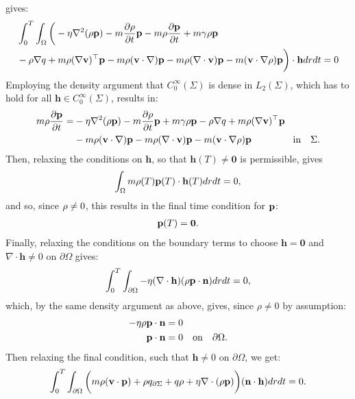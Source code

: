 gives:
\begin{align*}
&\int_0^T \int_\Omega 
\bigg( - \eta\nabla^2 (\rho \mathbf{p}) - m \frac{\partial \rho}{\partial t} \mathbf{p}  -  m\rho \frac{\partial \mathbf{p}}{\partial t} +m \gamma \rho \mathbf{p}\\
&-\rho\nabla q +m \rho (\nabla \mathbf{v})^\top\mathbf{p} 
-m \rho (\mathbf{v} \cdot \nabla)\mathbf{p} - m \rho (\nabla \cdot \mathbf{v})\mathbf{p}  - m (\mathbf{v} \cdot \nabla \rho)\mathbf{p}  \bigg)\cdot  \mathbf{h} drdt = 0
\end{align*}
Employing the density argument that $C_0^\infty(\Sigma)$ is dense in $L_2(\Sigma)$, which has to hold for all $\mathbf{h}\in C_0^\infty(\Sigma)$, results in:
\begin{align*}
  m\rho \frac{\partial \mathbf{p}}{\partial t} =& - \eta\nabla^2 (\rho \mathbf{p}) - m \frac{\partial \rho}{\partial t} \mathbf{p}   +m \gamma \rho \mathbf{p}-\rho\nabla q +m \rho (\nabla \mathbf{v})^\top\mathbf{p} \\
&-m \rho (\mathbf{v} \cdot \nabla)\mathbf{p} - m \rho (\nabla \cdot \mathbf{v})\mathbf{p}  - m (\mathbf{v} \cdot \nabla \rho)\mathbf{p}  \ \qquad\qquad \text{in} \quad \Sigma.
\end{align*}
Then, relaxing the conditions on $\mathbf{h}$, so that $\mathbf{h}(T) \neq \mathbf{0} $ is permissible, gives
\begin{align*}
 \int_\Omega m \rho(T) \mathbf{p}(T) \cdot \mathbf{h}(T) dr dt=0,
\end{align*}
and so, since $\rho \neq 0$, this results in the final time condition for $\mathbf{p}$:
\begin{align}
\mathbf{p}(T)=\mathbf{0}.
\end{align}
Finally, relaxing the conditions on the boundary terms to choose $\mathbf{h}=\mathbf{0}$ and $\nabla \cdot \mathbf{h}  \neq 0$ on $\partial \Omega$ gives:
\begin{align*}
\int_0^T \int_{\partial \Omega} -   \eta (\nabla \cdot \mathbf{h}) (\rho \mathbf{p} \cdot \mathbf{n})  dr dt = 0,
\end{align*}
which, by the same density argument as above, gives, since $\rho \neq 0$ by assumption:
\begin{align}
\label{CondAdj1}
- \eta  \rho \mathbf{p}  \cdot \mathbf{n}&= 0  \notag\\
 \mathbf{p}  \cdot \mathbf{n} &= 0 \quad \text{on} \quad \partial \Omega.
\end{align}
Then relaxing the final condition, such that $\mathbf{h} \neq 0$ on $\partial \Omega$, we get:
\begin{align*}
\int_0^T \int_{\partial\Omega} \bigg( m \rho (\mathbf{v} \cdot \mathbf{p})+\rho  {q}_{\partial \Sigma} + q \rho + \eta\nabla \cdot(\rho \mathbf{p})\bigg) ( \mathbf{n}\cdot \mathbf{h})dr dt=0.
\end{align*}
